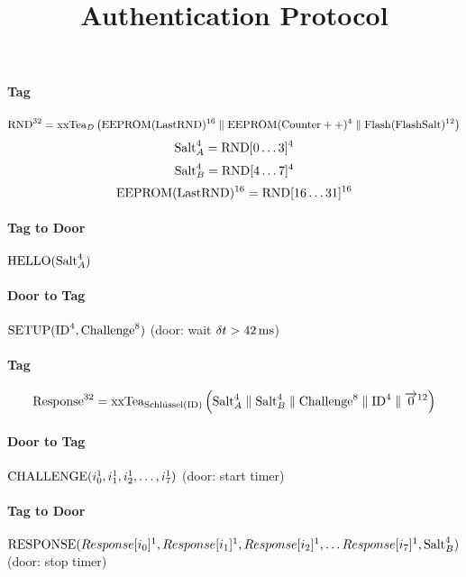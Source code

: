 \documentclass[a4paper,10pt]{scrartcl}
\title{\openbouncer{} Authentication Protocol}
\author{}
\begin{document}
\maketitle

\begin{abstract}

\end{abstract}

\section{}

\paragraph{Tag} $$\textnormal{RND}^{32} = \textnormal{xxTea}_D\left(\textnormal{EEPROM}(\textnormal{LastRND})^{16} \parallel \textnormal{EEPROM}(\textnormal{Counter}++)^{4} \parallel \textnormal{Flash}(\textnormal{FlashSalt})^{12} \right)$$
$$\textnormal{Salt}_A^{4} = \textnormal{RND}[0\ldots3]^{4}$$
$$\textnormal{Salt}_B^{4} = \textnormal{RND}[4\ldots7]^{4}$$
$$\textnormal{EEPROM}(\textnormal{LastRND})^{16} = \textnormal{RND}[16\ldots31]^{16}$$

\paragraph{Tag to Door} $\textnormal{HELLO}(\textnormal{Salt}_A^{4})$

\paragraph{Door to Tag} $\textnormal{SETUP}(\textnormal{ID}^{4}, \textnormal{Challenge}^{8})$
(door: wait $\delta t > 42\,\textnormal{ms}$)

\paragraph{Tag} $$\textnormal{Response}^{32} = \textnormal{xxTea}_{\textnormal{\scriptsize{Schlüssel}}(\textnormal{\scriptsize{ID})}}\left( \textnormal{Salt}_A^4 \parallel \textnormal{Salt}_B^4 \parallel \textnormal{Challenge}^8 \parallel \textnormal{ID}^4 \parallel \overrightarrow{0}^{12} \right)$$

\paragraph{Door to Tag} $\textnormal{CHALLENGE}(i_0^1, i_1^1, i_2^1, \ldots, i_7^1)$
(door: start timer)

\paragraph{Tag to Door} $\textnormal{RESPONSE}( Response[i_0]^1, Response[i_1]^1, Response[i_2]^1, \ldots Response[i_7]^1, \textnormal{Salt}_B^4 )$
(door: stop timer)
\end{document}
